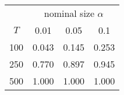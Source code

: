 % 
\begin{tabular}{cccc}
  \hline
  & \multicolumn{3}{c}{nominal size $\alpha$} \\
 $T$ & 0.01 & 0.05 & 0.1 \\
 \hline
100 & 0.043 & 0.145 & 0.253 \\ 
  250 & 0.770 & 0.897 & 0.945 \\ 
  500 & 1.000 & 1.000 & 1.000 \\ 
   \hline
\end{tabular}
